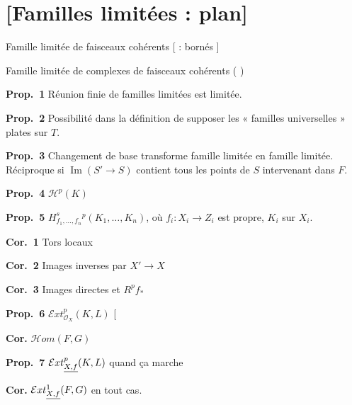 \documentclass[11pt,a4paper]{article}
\begin{document}
\section{[Familles limitées : plan]}

Famille limitée de faisceaux cohérents [ :  \struck{\ill{}} bornés ]

Famille limitée de complexes de faisceaux cohérents (\ill{} \ill{})

\textbf{Prop.\ 1} Réunion finie de familles limitées est limitée.

\textbf{Prop.\ 2} Possibilité dans la définition de supposer
 les  « familles
universelles » plates sur $T$.

\textbf{Prop.\ 3} Changement de base  \struck{\ill{}}
transforme famille limitée en famille limitée. Réciproque si
$\operatorname{Im}(S' \to S)$ contient tous les points de $S$ intervenant
dans $F$.

\textbf{Prop.\ 4} $\mathcal{H}^p(K)$

\textbf{Prop.\ 5} $H^{s}_{f_1, \ldots, f_n}{}^{p}(K_1, \ldots, K_n)$, où
$f_i : X_i \to Z_i$ est propre, $K_i$ sur $X_i$.

\textbf{Cor.\ 1} \struck{\ill{}} Tors locaux \struck{\ill{}}

\textbf{Cor.\ 2} Images inverses par $X' \to X$

\textbf{Cor.\ 3} Images directes et $R^p f_*$

\textbf{Prop.\ 6} $\mathcal{E}xt^p_{\mathcal{O}_X}(K, L)$ \quad [

\textbf{Cor.} $\mathcal{H}om(F, G)$

\textbf{Prop.\ 7} $\mathcal{E}xt^p_{\uncertain{X, f}}(K, L)$
quand ça marche

\textbf{Cor.} $\mathcal{E}xt^1_{\uncertain{X, f}}(F, G)$ en tout cas.
\end{document}
